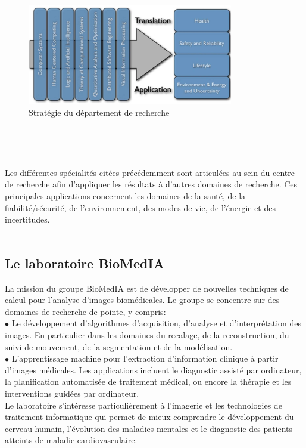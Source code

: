 \documentclass[10pt]{report}
\begin{document}
	\begin{figure}
		\includegraphics[width=9cm]{Reports/figures/research_strategy.jpg}
		\caption{Stratégie du département de recherche}
		\label{Stratégie du département de recherche}
	\end{figure}~\par~\par
	
	Les différentes spécialités citées précédemment sont articulées au sein du centre de recherche afin d'appliquer les résultats à d'autres domaines de recherche. Ces principales applications concernent les domaines de la santé, de la fiabilité/sécurité, de l'environnement, des modes de vie, de l'énergie et des incertitudes.
	\\
	\\
	\subsection{Le laboratoire BioMedIA}

	La mission du groupe BioMedIA est de développer de nouvelles techniques de
	calcul pour l'analyse d'images biomédicales. Le groupe se concentre sur des
	domaines de recherche de pointe, y compris:\\
	{$\bullet$} Le développement d'algorithmes d'acquisition, d'analyse et d'interprétation des images. En particulier dans les domaines du recalage, de la reconstruction,
	du suivi de mouvement, de la segmentation et de la modélisation. \\
	{$\bullet$} L'apprentissage machine pour l'extraction d'information clinique à partir
	d'images médicales. Les applications incluent le diagnostic assisté par
	ordinateur, la planification automatisée de traitement médical, ou encore la thérapie et les interventions guidées par ordinateur. \\
	Le laboratoire s'intéresse particulièrement à l'imagerie et les technologies de
	traitement informatique qui permet de mieux comprendre le
	développement du cerveau humain, l’évolution des maladies mentales et le
	diagnostic des patients atteints de maladie cardiovasculaire.
	
\end{document}
